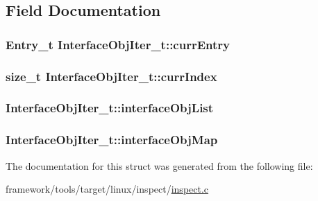 \subsection{Field Documentation}
\subsubsection[{\texorpdfstring{curr\+Entry}{currEntry}}]{\setlength{\rightskip}{0pt plus 5cm}Entry\+\_\+t Interface\+Obj\+Iter\+\_\+t\+::curr\+Entry}\hypertarget{struct_interface_obj_iter__t_a087b2f81d8e0cb4ba7fd4d0735f44d5c}{}\label{struct_interface_obj_iter__t_a087b2f81d8e0cb4ba7fd4d0735f44d5c}
\subsubsection[{\texorpdfstring{curr\+Index}{currIndex}}]{\setlength{\rightskip}{0pt plus 5cm}size\+\_\+t Interface\+Obj\+Iter\+\_\+t\+::curr\+Index}\hypertarget{struct_interface_obj_iter__t_adf89558df500167be0f851904fc8af04}{}\label{struct_interface_obj_iter__t_adf89558df500167be0f851904fc8af04}
\subsubsection[{\texorpdfstring{interface\+Obj\+List}{interfaceObjList}}]{ Interface\+Obj\+Iter\+\_\+t\+::interface\+Obj\+List}\hypertarget{struct_interface_obj_iter__t_ad436cfde49c1ea9aebabab10608450e1}{}\label{struct_interface_obj_iter__t_ad436cfde49c1ea9aebabab10608450e1}
\subsubsection[{\texorpdfstring{interface\+Obj\+Map}{interfaceObjMap}}]{ Interface\+Obj\+Iter\+\_\+t\+::interface\+Obj\+Map}\hypertarget{struct_interface_obj_iter__t_ae6d566bd8ff172e95994d2ff4ce70a19}{}\label{struct_interface_obj_iter__t_ae6d566bd8ff172e95994d2ff4ce70a19}


The documentation for this struct was generated from the following file\+:\begin{DoxyCompactItemize}
\item 
framework/tools/target/linux/inspect/\hyperlink{inspect_8c}{inspect.\+c}\end{DoxyCompactItemize}
